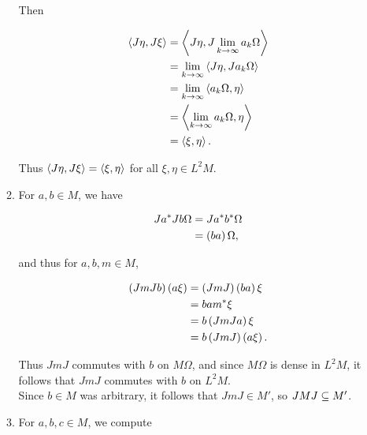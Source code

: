 \documentclass[a4paper,10pt]{report}
\begin{document}
\begin{enumerate}
\begin{enumerate}
                  Then

                  \begin{align*}
                    \ET J \eta , J \xi \TE%
                    &= \ET J \eta , J \lim_{k \to \infty} a_k \Omega \TE\\
                    &= \lim_{k \to \infty} \ET J \eta , J a_k \Omega \TE\\
                    &= \lim_{k \to \infty} \ET a_k \Omega , \eta \TE\\
                    &= \ET \lim_{k \to \infty} a_k \Omega , \eta \TE\\
                    &= \ET \xi , \eta \TE.
                  \end{align*}

                  Thus $\left\langle J \eta , J \xi \right\rangle = \left\langle \xi , \eta \right\rangle$ for all $\xi , \eta \in L^2 M$.\\
                  

		\item For $a , b \in M$, we have

                  \begin{align*}
                    J a^* J b \Omega%
                    &= J a^* b^* \Omega\\
                    &= \E b a \R \Omega,
                  \end{align*}

                  and thus for $a , b , m \in M$,

                  \begin{align*}
                    \E J m J b \R \E a \xi \R%
                    &= \E J m J \R \E b a \R \xi\\
                    &= b a m^* \xi\\
                    &= b \E J m J a \R \xi\\
                    &= b \E J m J \R \E a \xi \R.
                  \end{align*}

                  Thus $J m J$ commutes with $b$ on $M \Omega$, and since $M \Omega$ is dense in $L^2 M$, it follows that $J m J$ commutes with $b$ on $L^2 M$.\\
                  Since $b \in M$ was arbitrary, it follows that $J m J \in M'$, so $J M J \subseteq M'$.
                  

	        \item For $a , b , c \in M$, we compute


\end{enumerate}
\end{enumerate}
\end{document}
